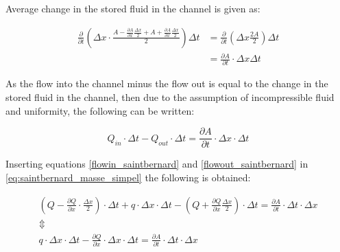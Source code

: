 Average change in the stored fluid in the channel is given as:

\begin{equation}\label{stored_saintbernard}
\begin{aligned}
\frac{\partial}{\partial t} \left(\Delta x \cdot \frac{A- \frac{\partial A}{\partial x} \frac{\Delta x}{2} +A + \frac{\partial A}{\partial x} \frac{\Delta x}{2}}{2}  \right) \Delta t 
& = \frac{\partial}{\partial t} \left( \Delta x \frac{2A}{2} \right) \Delta t \\
& = \frac{\partial A}{\partial t} \cdot \Delta x	\Delta t
\end{aligned}
\end{equation}


As the flow into the channel minus the flow out is equal to the change in the stored fluid in the channel, then due to the assumption of incompressible fluid and uniformity, the following can be written:  

\begin{equation}\label{eq:saintbernard_masse_simpel}
	Q_{in}\cdot \Delta t - Q_{out}\cdot \Delta t = \frac{\partial A}{\partial t} \cdot \Delta x	\cdot \Delta t
\end{equation}

Inserting equations \ref{flowin_saintbernard} and \ref{flowout_saintbernard} in \ref{eq:saintbernard_masse_simpel} the following is obtained:

\begin{equation}
\begin{array}{l}
	\left(Q - \frac{\partial Q}{\partial x}\cdot \frac{\Delta x}{2}\right) \cdot \Delta t + q \cdot \Delta x \cdot \Delta t - \left(Q + \frac{\partial Q}{ \partial x} \frac{\Delta x}{2} \right) \cdot \Delta t  = \frac{\partial A}{\partial t}\cdot \Delta t 
	\cdot \Delta x \\ 
\Updownarrow \\
q \cdot \Delta x \cdot \Delta t  - \frac{\partial Q}{\partial x} \cdot \Delta x \cdot \Delta t  = \frac{\partial A}{\partial t} \cdot \Delta t 
	\cdot \Delta x 
\end{array}
\label{saintbernard_masse}
\end{equation}

